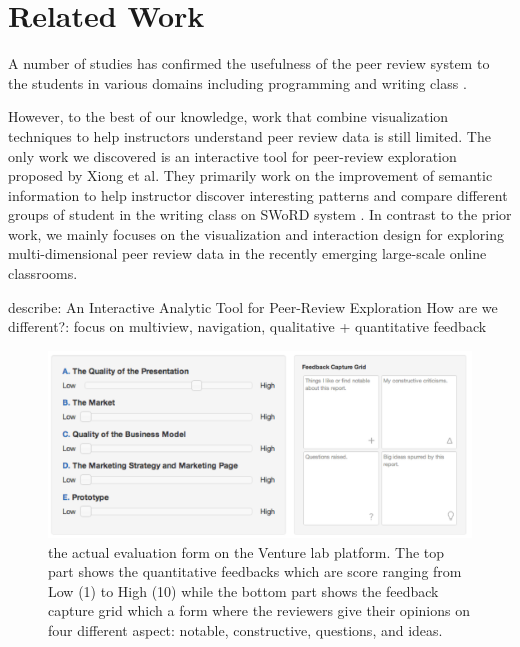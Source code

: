\documentclass{sigchi}
\begin{document}
\section{Related Work}

A number of studies has confirmed the usefulness of the peer review system
to the students in various domains including programming and writing class
\cite{MyPeerReview,WebBasedPeerReview}.


However, to the best of our knowledge, work that combine visualization techniques
to help instructors understand peer review data is still limited.
The only work we discovered is  an interactive tool for peer-review exploration
proposed by Xiong et al. \cite{xiong}
They primarily work on the improvement of semantic information
to help instructor discover interesting patterns and
compare different groups of student in the writing class on SWoRD system \cite{Cho2007}.
In contrast to the prior work, we mainly focuses on the visualization
and interaction design for exploring multi-dimensional peer review data
in the recently emerging large-scale online classrooms.

describe: An Interactive Analytic Tool for Peer-Review Exploration How are we
different?: focus on multiview, navigation, qualitative + quantitative feedback


\begin{figure}[!t]
\centering
\includegraphics[width=\columnwidth]{images/review-form}
\caption{the actual evaluation form on the Venture lab platform.
The top part shows the quantitative feedbacks which are score ranging
from Low (1) to High (10) while the bottom part shows the feedback capture grid
which a form where the reviewers give their opinions
on four different aspect: notable, constructive, questions, and ideas.}
\label{fig:review-form}
\end{figure}
\end{document}

